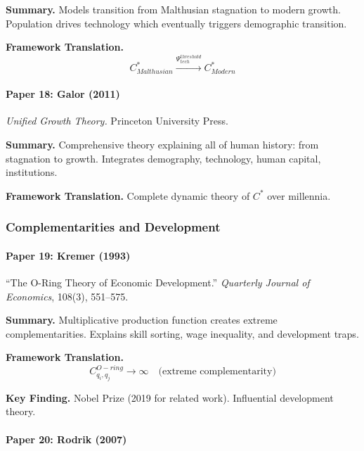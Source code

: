 \textbf{Summary.}
Models transition from Malthusian stagnation to modern growth. Population 
drives technology which eventually triggers demographic transition.

\textbf{Framework Translation.}
\begin{equation}
C^*_{Malthusian} \xrightarrow{\Psi_{tech}^{threshold}} C^*_{Modern}
\end{equation}

\paragraph{Paper 18: Galor (2011)}

\textit{Unified Growth Theory.}
Princeton University Press.

\textbf{Summary.}
Comprehensive theory explaining all of human history: from stagnation to growth.
Integrates demography, technology, human capital, institutions.

\textbf{Framework Translation.}
Complete dynamic theory of $C^*$ over millennia.

\subsubsection{Complementarities and Development}

\paragraph{Paper 19: Kremer (1993)}

``The O-Ring Theory of Economic Development.''
\textit{Quarterly Journal of Economics}, 108(3), 551--575.

\textbf{Summary.}
Multiplicative production function creates extreme complementarities. 
Explains skill sorting, wage inequality, and development traps.

\textbf{Framework Translation.}
\begin{equation}
C_{q_i, q_j}^{O-ring} \to \infty \quad \text{(extreme complementarity)}
\end{equation}

\textbf{Key Finding.}
Nobel Prize (2019 for related work). Influential development theory.

\paragraph{Paper 20: Rodrik (2007)}

